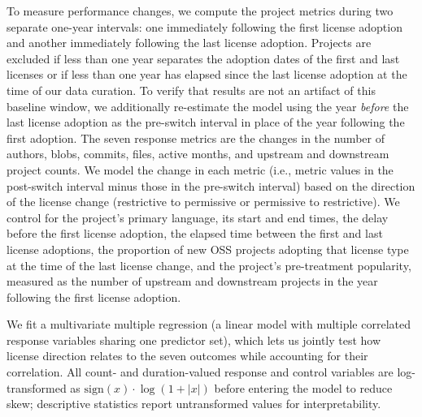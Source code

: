To measure performance changes, we compute the project metrics during two separate
one-year intervals: one immediately following the first license adoption and
another immediately following the last license adoption.
Projects are excluded if less than one year separates the adoption dates of the
first and last licenses or if less than one year has elapsed since the last 
license adoption at the time of our data curation. 
To verify that results are not an artifact of this baseline window, we additionally
re-estimate the model using the year \emph{before} the last license adoption as the
pre-switch interval in place of the year following the first adoption.
The seven response metrics are the changes in the number of authors, blobs,
commits, files, active months, and upstream and downstream project counts.
We model the change in each metric (i.e., metric values in the post-switch 
interval minus those in the pre-switch interval) based on the direction of the 
license change (restrictive to permissive or permissive to restrictive).
We control for the project's primary language, its start and 
end times, the delay before the first license adoption, the elapsed time between
the first and last license adoptions, the proportion of new OSS projects 
adopting that license type at the time of the last license change, and the
project's pre-treatment popularity, measured as the number of upstream and
downstream projects in the year following the first license adoption.

We fit a multivariate multiple regression (a linear model with multiple
correlated response variables sharing one predictor set), which lets us
jointly test how license direction relates to the seven outcomes while
accounting for their correlation. All count- and duration-valued response
and control variables are log-transformed as
$\mathrm{sign}(x)\cdot\log(1+|x|)$ before entering the model to reduce
skew; descriptive statistics report untransformed values for
interpretability.
